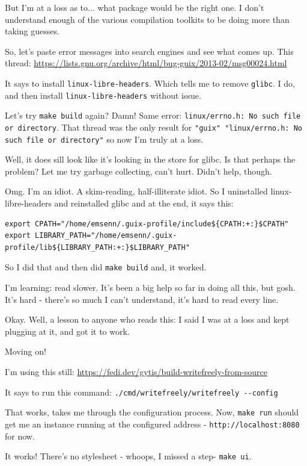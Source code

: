 \documentclass[11pt]{article}
\begin{document}
But I'm at a loss as to... what package would be the right one. I
don't understand enough of the various compilation toolkits to be
doing more than taking guesses.

So, let's paste error messages into search engines and see what comes
up. This thread:
\url{https://lists.gnu.org/archive/html/bug-guix/2013-02/msg00024.html}

It says to install \texttt{linux-libre-headers}. Which tells me to remove
\texttt{glibc}. I do, and then install \texttt{linux-libre-headers} without issue.

Let's try \texttt{make build} again? Damn! Same error: \texttt{linux/errno.h: No
such file or directory}. That thread was the only result for \texttt{"guix"
"linux/errno.h: No such file or directory"} so now I'm truly at a
loss.

Well, it does sill look like it's looking in the store for glibc. Is
that perhaps the problem? Let me try garbage collecting, can't hurt.
Didn't help, though.

Omg. I'm an idiot. A skim-reading, half-illiterate idiot. So I
uninstalled linux-libre-headers and reinstalled glibc and at the end,
it says this:

\begin{verbatim}
export CPATH="/home/emsenn/.guix-profile/include${CPATH:+:}$CPATH"
export LIBRARY_PATH="/home/emsenn/.guix-profile/lib${LIBRARY_PATH:+:}$LIBRARY_PATH"
\end{verbatim}

So I did that and then did \texttt{make build} and, it worked.

I'm learning: read slower. It's been a big help so far in doing all
this, but gosh. It's hard - there's so much I can't understand, it's
hard to read every line.

Okay. Well, a lesson to anyone who reads this: I said I was at a loss
and kept plugging at it, and got it to work.

Moving on!

I'm using this still:
\url{https://fedi.dev/gytis/build-writefreely-from-source}

It says to run this command: \texttt{./cmd/writefreely/writefreely -{}-config}

That works, takes me through the configuration process. Now, \texttt{make
run} should get me an instance running at the configured address -
\texttt{http://localhost:8080} for now.

It works! There's no stylesheet - whoops, I missed a step- \texttt{make ui}.
\end{document}
